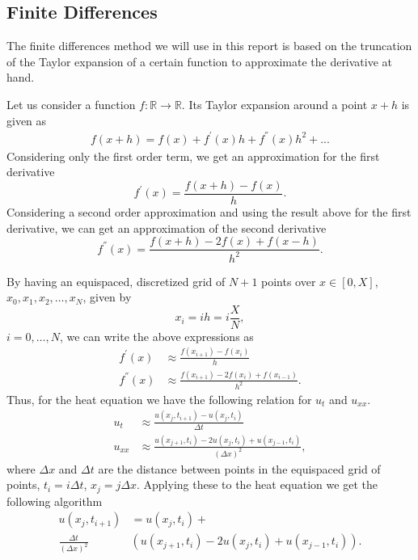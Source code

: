 \documentclass[aps,reprint,superscriptaddress,nofootinbib]{revtex4-2}
\begin{document}
\subsection{Finite Differences}
    
    The finite differences method we will use in this report is based on the truncation of the Taylor expansion of a certain function to approximate the derivative at hand. 
    
    Let us consider a function \(f: \mathbb{R} \to \mathbb{R}\). Its Taylor expansion around a point \(x + h\) is given as
    \begin{align*}
        f(x + h) = f(x) + f^{'}(x) h + f^{''}(x) h^2 + ...
    \end{align*}
    Considering only the first order term, we get an approximation for the first derivative
    \begin{equation*}
        f^{'}(x) = \frac{f(x + h) - f(x)}{h}.
    \end{equation*}
    Considering a second order approximation and using the result above for the first derivative, we can get an approximation of the second derivative
    \begin{equation*}
        f^{''}(x) = \frac{f(x + h) - 2f(x) + f(x - h)}{h^2}.
    \end{equation*}
    
    By having an equispaced, discretized grid of \(N + 1\) points over \(x \in [0, X]\), \(x_0, x_1, x_2, \hdots, x_N\), given by
    \begin{equation*}
        x_i = i h = i \frac{X}{N},
    \end{equation*}
    \(i=0, \hdots, N\), we can write the above expressions as 
    \begin{align*}
        f^{'}(x) &\approx \frac{f(x_{i + 1}) - f(x_i)}{h} \\
        f^{''}(x) &\approx \frac{f(x_{i+1}) - 2f(x_i) + f(x_{i-1})}{h^2}.
    \end{align*}
    Thus, for the heat equation we have the following relation for \(u_t\) and \(u_{xx}\).
    \begin{align*}
        u_t &\approx \frac{u(x_j, t_{i + 1}) - u(x_j, t_i)}{\Delta t} \\
        u_{xx} &\approx \frac{u(x_{j+1}, t_i) - 2u(x_j, t_i) + u(x_{j-1}, t_i)}{(\Delta x)^2},
    \end{align*}
    where \(\Delta x\) and \(\Delta t\) are the distance between points in the equispaced grid of points, \(t_i = i\Delta t\), \(x_j = j\Delta x\). Applying these to the heat equation we get the following algorithm
    \begin{align*}
        u(x_j, t_{i + 1}) &= u(x_j, t_i) + \\\frac{\Delta t}{(\Delta x)^2} &(u(x_{j+1}, t_i) - 2u(x_j, t_i) + u(x_{j-1}, t_i)).
    \end{align*}
    
\end{document}
